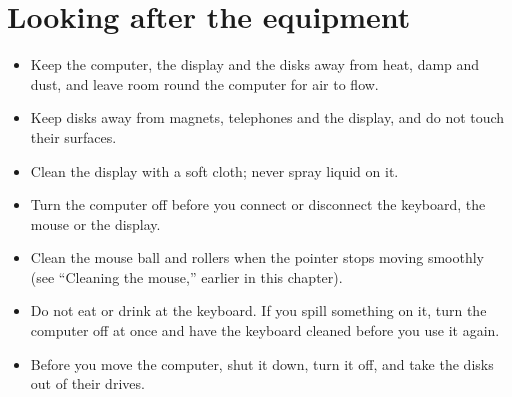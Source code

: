 \section{Looking after the equipment}
\begin{itemize}
\item Keep the computer, the display and the disks away from heat, damp
  and dust, and leave room round the computer for air to flow.
\item Keep disks away from magnets, telephones and the display, and do not
  touch their surfaces.
\item Clean the display with a soft cloth; never spray liquid on it.
\item Turn the computer off before you connect or disconnect the keyboard,
  the mouse or the display.
\item Clean the mouse ball and rollers when the pointer stops moving
  smoothly (see ``Cleaning the mouse,'' earlier in this chapter).
\item Do not eat or drink at the keyboard.  If you spill something on it,
  turn the computer off at once and have the keyboard cleaned before you
  use it again.
\item Before you move the computer, shut it down, turn it off, and take
  the disks out of their drives.
\end{itemize}

